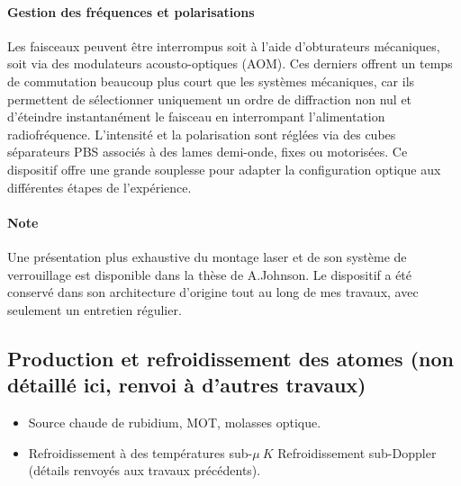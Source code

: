 \paragraph{Gestion des fréquences et polarisations}
Les faisceaux peuvent être interrompus soit à l’aide d’obturateurs mécaniques, soit via des modulateurs acousto-optiques (AOM). Ces derniers offrent un temps de commutation beaucoup plus court que les systèmes mécaniques, car ils permettent de sélectionner uniquement un ordre de diffraction non nul et d’éteindre instantanément le faisceau en interrompant l’alimentation radiofréquence. L’intensité et la polarisation sont réglées via des cubes séparateurs PBS associés à des lames demi-onde, fixes ou motorisées. Ce dispositif offre une grande souplesse pour adapter la configuration optique aux différentes étapes de l’expérience.


\paragraph{Note}
Une présentation plus exhaustive du montage laser et de son système de verrouillage est disponible dans la thèse de A.Johnson\cite{Johnson2016}. Le dispositif a été conservé dans son architecture d’origine tout au long de mes travaux, avec seulement un entretien régulier.


\subsection{Production et refroidissement des atomes (non détaillé ici, renvoi à d'autres travaux)}
{\color{blue}
\begin{itemize}
    \item Source chaude de rubidium, MOT, molasses optique.
    \item Refroidissement à des températures sub-$\mu~K$ Refroidissement sub-Doppler (détails renvoyés aux travaux précédents).
\end{itemize}
}

